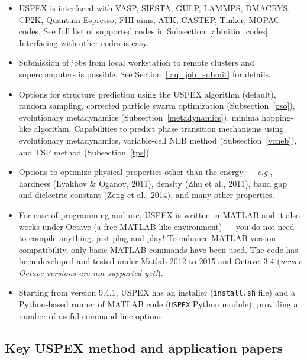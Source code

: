 \documentclass[12pt]{article}
\newcommand{\file}[1]{\texttt{#1}}
\begin{document}
\begin{itemize}
\item USPEX is interfaced with VASP, SIESTA, GULP, LAMMPS, DMACRYS, CP2K,
Quantum Espresso, FHI-aims, ATK, CASTEP, Tinker, MOPAC codes. See full list of
supported codes in Subsection~\ref{abinitio_codes}. Interfacing with other codes
is easy.

\item Submission of jobs from local workstation to remote clusters and
supercomputers is possible. See Section~\ref{faq_job_submit} for details.

\item Options for structure prediction using the USPEX algorithm (default),
random sampling, corrected particle swarm optimization (Subsection~\ref{pso}),
evolutionary metadynamics (Subsection~\ref{metadynamics}), minima hopping-like
algorithm. Capabilities to predict phase transition mechanisms using
evolutionary metadynamics, variable-cell NEB method (Subsection~\ref{vcneb}),
and TSP method (Subsection~\ref{tps}).

\item Options to optimize physical properties other than the energy ---
\emph{e.g.}, hardness (Lyakhov \& Oganov, 2011), density (Zhu et al., 2011),
band gap and dielectric constant (Zeng et al., 2014), and many other properties.

\item For ease of programming and use, USPEX is written in MATLAB and it also
works under Octave (a free MATLAB-like environment) --- you do not need to
compile anything, just plug and play! To enhance MATLAB-version compatibility,
only basic MATLAB commands have been used. The code has been developed and
tested under Matlab 2012 to 2015 and Octave~3.4 (\emph{newer Octave versions are
not supported yet!}).

\item Starting from version 9.4.1, USPEX has an installer (\file{install.sh}
file) and a Python-based runner of MATLAB code (\file{USPEX} Python module),
providing a number of useful command line options.

\end{itemize}

\subsection{Key USPEX method and application papers}
\end{document}
